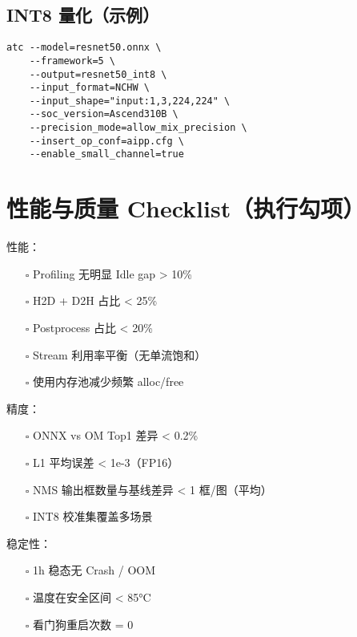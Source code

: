 \subsection{INT8 量化（示例）}\label{int8-ux91cfux5316ux793aux4f8b}

\begin{lstlisting}
atc --model=resnet50.onnx \
    --framework=5 \
    --output=resnet50_int8 \
    --input_format=NCHW \
    --input_shape="input:1,3,224,224" \
    --soc_version=Ascend310B \
    --precision_mode=allow_mix_precision \
    --insert_op_conf=aipp.cfg \
    --enable_small_channel=true
\end{lstlisting}

\section{性能与质量
Checklist（执行勾项）}\label{ux6027ux80fdux4e0eux8d28ux91cf-checklistux6267ux884cux52feux9879}

性能：

\begin{itemize}
\tightlist
\item[$\square$]
  Profiling 无明显 Idle gap \textgreater{} 10\%
\item[$\square$]
  H2D + D2H 占比 \textless{} 25\%
\item[$\square$]
  Postprocess 占比 \textless{} 20\%
\item[$\square$]
  Stream 利用率平衡（无单流饱和）
\item[$\square$]
  使用内存池减少频繁 alloc/free
\end{itemize}

精度：

\begin{itemize}
\tightlist
\item[$\square$]
  ONNX vs OM Top1 差异 \textless{} 0.2\%
\item[$\square$]
  L1 平均误差 \textless{} 1e-3（FP16）
\item[$\square$]
  NMS 输出框数量与基线差异 \textless{} 1 框/图（平均）
\item[$\square$]
  INT8 校准集覆盖多场景
\end{itemize}

稳定性：

\begin{itemize}
\tightlist
\item[$\square$]
  1h 稳态无 Crash / OOM
\item[$\square$]
  温度在安全区间 \textless{} 85°C
\item[$\square$]
  看门狗重启次数 = 0
\end{itemize}

